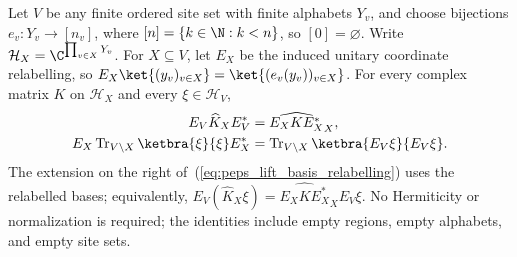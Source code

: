 \begin{lemma}
    \label{thm:peps_regional_basis_relabelling}
    \leanok
    Let $V$ be any finite ordered site set with finite alphabets $Y_v$,
    and choose bijections $e_v:Y_v\to[n_v]$, where
    $[n]=\{k\in\N:k<n\}$, so $[0]=\varnothing$.
    Write $\mathcal H_X=\C^{\prod_{v\in X}Y_v}$.
    For $X\subseteq V$, let $E_X$ be the induced unitary coordinate
    relabelling, so $E_X\ket{(y_v)_{v\in X}}=
        \ket{(e_v(y_v))_{v\in X}}$.
    For every complex matrix $K$ on $\mathcal H_X$ and every
    $\xi\in\mathcal H_V$,
    \begin{align}
        E_V\widehat K_XE_V^*
         & =\widehat{E_XKE_X^*}_X,
        \label{eq:peps_lift_basis_relabelling} \\
        E_X\operatorname{Tr}_{V\setminus X}
        \ketbra{\xi}{\xi}E_X^*
         & =\operatorname{Tr}_{V\setminus X}
        \ketbra{E_V\xi}{E_V\xi}.
        \label{eq:peps_marginal_basis_relabelling}
    \end{align}
    The extension on the right of~(\ref{eq:peps_lift_basis_relabelling})
    uses the relabelled bases; equivalently,
    $E_V(\widehat K_X\xi)=\widehat{E_XKE_X^*}_XE_V\xi$.
    No Hermiticity or normalization is required; the identities include
    empty regions, empty alphabets, and empty site sets.


\end{lemma}
